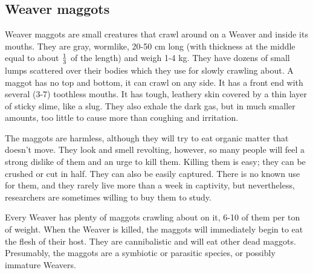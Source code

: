 \subsection{Weaver maggots}
Weaver maggots are small creatures that crawl around on a Weaver and inside its mouths. They are gray, wormlike, 20-50 cm long (with thickness at the middle equal to about $\textstyle{\frac{1}{3}}$ of the length) and weigh 1-4 kg. They have dozens of small lumps scattered over their bodies which they use for slowly crawling about. A maggot has no top and bottom, it can crawl on any side. It has a front end with several (3-7) toothless mouths. It has tough, leathery skin covered by a thin layer of sticky slime, like a slug. They also exhale the dark gas, but in much smaller amounts, too little to cause more than coughing and irritation. 

The maggots are harmless, although they will try to eat organic matter that doesn't move. They look and smell revolting, however, so many people will feel a strong dislike of them and an urge to kill them. Killing them is easy; they can be crushed or cut in half. They can also be easily captured. There is no known use for them, and they rarely live more than a week in captivity, but nevertheless, researchers are sometimes willing to buy them to study. 

Every Weaver has plenty of maggots crawling about on it, 6-10 of them per ton of weight. When the Weaver is killed, the maggots will immediately begin to eat the flesh of their host. They are cannibalistic and will eat other dead maggots. Presumably, the maggots are a symbiotic or parasitic species, or possibly immature Weavers. 























